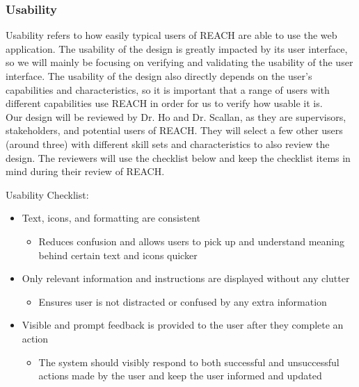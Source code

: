 \documentclass[12pt, titlepage]{article}
\begin{document}
\subsubsection{Usability}

Usability refers to how easily typical users of REACH are able to use the web application. The 
usability of the design is greatly impacted by its user interface, so we will mainly be focusing 
on verifying and validating the usability of the user interface. The usability of the design also 
directly depends on the user's capabilities and characteristics, so it is important that a range 
of users with different capabilities use REACH in order for us to verify how usable it is.\\

Our design will be reviewed by Dr. Ho and Dr. Scallan, as they are supervisors, stakeholders, and 
potential users of REACH. They will select a few other users (around three) with different 
skill sets and characteristics to also review the design. The reviewers will use the checklist 
below and keep the checklist items in mind during their review of REACH.

Usability Checklist:
\begin{itemize}
  \item Text, icons, and formatting are consistent
  \begin{itemize}
    \item Reduces confusion and allows users to pick up and understand meaning behind certain text and icons quicker
  \end{itemize}
\end{itemize}

\begin{itemize}
  \item Only relevant information and instructions are displayed without any clutter
  \begin{itemize}
    \item Ensures user is not distracted or confused by any extra information
  \end{itemize}
\end{itemize}

\begin{itemize}
  \item Visible and prompt feedback is provided to the user after they complete an action
  \begin{itemize}
    \item The system should visibly respond to both successful and unsuccessful actions made by the user and keep the user informed and updated
  \end{itemize}
\end{itemize}
\end{document}
